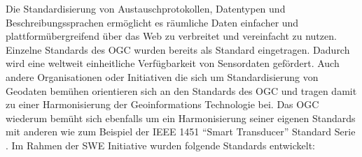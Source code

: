 Die Standardisierung von Austauschprotokollen, Datentypen und Beschreibungssprachen ermöglicht es räumliche Daten einfacher und plattformübergreifend über das Web zu verbreitet und vereinfacht zu nutzen. Einzelne Standards des \gls{OGC} wurden bereits als  Standard eingetragen. Dadurch wird eine weltweit einheitliche Verfügbarkeit von Sensordaten gefördert. Auch andere Organisationen oder Initiativen die sich um Standardisierung von Geodaten bemühen orientieren sich an den Standards des \gls{OGC} und tragen damit zu einer Harmonisierung der Geoinformations Technologie bei. Das \gls{OGC} wiederum bemüht sich ebenfalls um ein Harmonisierung seiner eigenen Standards mit anderen wie zum Beispiel der IEEE 1451 ``Smart Transducer'' Standard Serie \citep{botts_ogc_2008}. Im Rahmen der \gls{SWE} Initiative wurden folgende Standards entwickelt:

